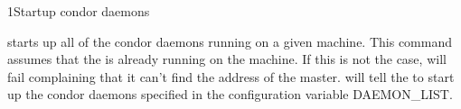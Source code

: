\begin{ManPage}{}{1}{Startup condor daemons}
\label{man-condor-on}
\Synopsis {}

\Description 

 starts up all of the condor daemons running on a given
machine.  This command assumes that the  is already
running on the machine.  If this is not the case,  will
fail complaining that it can't find the address of the master.  
will tell the  to start up the condor daemons specified
in the configuration variable DAEMON\_LIST.

\begin{Options}
\end{Options}

\end{ManPage}
